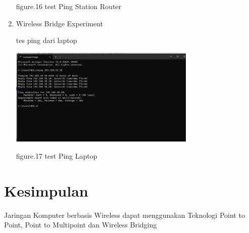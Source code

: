 \begin{enumerate}
\begin{center}
        figure.16 test Ping Station Router
    \end{center}

    \item Wireless Bridge Experiment
    
    tes ping dari laptop
    \begin{center}
        \includegraphics[width=0.7\textwidth]{image/P1/Wireless/5-laptoptestping.png}    
        
        figure.17 test Ping Laptop
    \end{center}
    
\end{enumerate}

\section{Kesimpulan}

Jaringan Komputer berbasis Wireless dapat menggunakan Teknologi Point to Point, Point to Multipoint dan Wireless Bridging